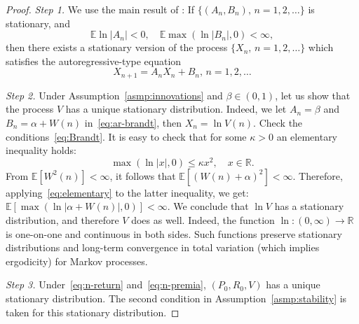 \documentclass[12pt]{amsart}
\begin{document}
\begin{proof} {\it Step 1.} We use the main result of \cite{Brandt}: If $\{(A_n, B_n),\, n = 1, 2, \ldots\}$ is stationary, and 
\begin{equation}
\label{eq:Brandt}
\mathbb E\ln|A_n| < 0,\quad \mathbb E\max(\ln|B_n|, 0) < \infty,
\end{equation}
then there exists a stationary version of the process $\{X_n,\, n = 1, 2, \ldots\}$ which satisfies the autoregressive-type equation
\begin{equation}
\label{eq:ar-brandt}
X_{n+1} = A_nX_n + B_n,\, n = 1, 2, \ldots
\end{equation}

 {\it Step 2.} Under Assumption~\ref{asmp:innovations} and $\beta \in (0, 1)$, let us show that the process $V$ has a unique stationary distribution. Indeed, we let $A_n = \beta$ and $B_n = \alpha + W(n)$ in~\eqref{eq:ar-brandt}, then $X_n = \ln V(n)$. Check the conditions~\eqref{eq:Brandt}. It is easy to check that for some $\kappa > 0$ an elementary inequality holds:
\begin{equation}
\label{eq:elementary}
\max(\ln|x|, 0) \le \kappa x^2,\quad x \in \mathbb R.
\end{equation}
From $\mathbb E[W^2(n)] < \infty$, it follows that $\mathbb E[(W(n) + \alpha)^2] < \infty$. Therefore, applying~\eqref{eq:elementary} to the latter inequality, we get: 
$\mathbb E[\max(\ln|\alpha + W(n)|, 0)] < \infty$. We conclude that $\ln V$ has a stationary distribution, and therefore $V$ does as well. Indeed, the function $\ln : (0, \infty) \to \mathbb R$ is one-on-one and continuous in both sides. Such functions preserve stationary distributions and long-term convergence in total variation (which implies ergodicity) for Markov processes. 

{\it Step 3.} Under~\eqref{eq:n-return} and~\eqref{eq:n-premia}, $(P_0, R_0, V)$ has a unique stationary distribution. The second condition in Assumption~\ref{asmp:stability} is taken for this stationary distribution.


\end{proof}
\end{document}
